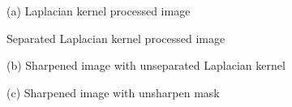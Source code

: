 \problem{}
(a) Laplacian kernel
processed image


Separated Laplacian kernel
processed image




(b) Sharpened image with unseparated Laplacian kernel





(c) Sharpened image with unsharpen mask













\newpage